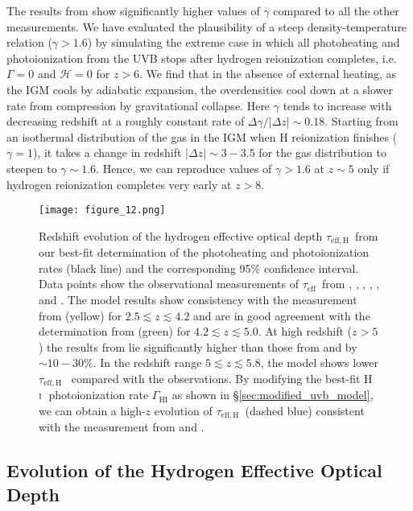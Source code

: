 \documentclass[twocolumn]{aastex62}
\def\HI{\hbox{\rm H~$\scriptstyle\rm I$}}
\newcommand\taueff{$\tau_{\mathrm{eff}}$~}
\newcommand\taueffH{$\tau_{\mathrm{eff,H}}$~}
\begin{document}
The results from \cite{walther2019a} 
show significantly higher values of $\gamma$ compared to all the other measurements. We have evaluated the plausibility
of a steep density-temperature relation ($\gamma > 1.6$) by simulating the extreme case in which all photoheating and photoionization
from the UVB stops after hydrogen reionization completes,  i.e. $\Gamma = 0$ and $\mathcal{H}=0$ for $z > 6$. We find that in the absence of 
external heating, as the IGM cools by adiabatic expansion, the overdensities cool down at a slower rate from compression by gravitational collapse. Here 
$\gamma$ tends to increase with decreasing redshift at a 
roughly constant rate of $\Delta \gamma / |\Delta z| \sim 0.18 $. Starting from an 
isothermal distribution of the gas in the IGM when H reionization finishes ($\gamma = 1$),  it takes a change in redshift  $ |\Delta z| \sim 3 - 3.5 $ 
for the gas distribution to steepen to $\gamma \sim 1.6$. 
Hence, we can reproduce values of 
$\gamma > 1.6$ at $z\sim 5$ only if hydrogen reionization completes very early at $z > 8$.   


\begin{figure}
\texttt{[image: figure\_12.png]}
\caption{  Redshift evolution of the hydrogen effective optical depth \taueffH from our best-fit
determination of the photoheating and photoionization rates (black line) and the
corresponding 95\% confidence interval. Data points show the observational measurements of \taueff from \cite{Fan+2006}, \cite{Becker+2013a}, 
\cite{Bosman_2018}, \cite{eilers2018a}, \cite{boera2019a}, and \cite{Yang+2020b}.
The model results show consistency
with the measurement from \cite{Becker+2013a} (yellow) for $2.5 \lesssim z \lesssim 4.2$ and are in 
good agreement with the determination from \cite{boera2019a} (green) for $4.2 \lesssim z \lesssim 5.0$.
At high redshift ($z>5$) the results from \cite{Yang+2020b} lie significantly 
higher than those from \cite{eilers2018a} and \cite{Bosman_2018} by $\sim 10-30 \%$.
In the redshift range $5 \lesssim z \lesssim 5.8$, the model shows lower \taueffH 
compared with the observations.
By modifying the best-fit  \HI\ photoionization rate $\Gamma_\mathrm{HI}$
as shown in \S \ref{sec:modified_uvb_model}, we can obtain a high-$z$
evolution of \taueffH (dashed blue) consistent
with the measurement from \cite{Bosman_2018} and \cite{Fan+2006}.    }     
\label{fig:tau_HI}
\end{figure}


\subsection{Evolution of the Hydrogen Effective Optical Depth} \label{sec:evolution_tau_HI }
\end{document}
